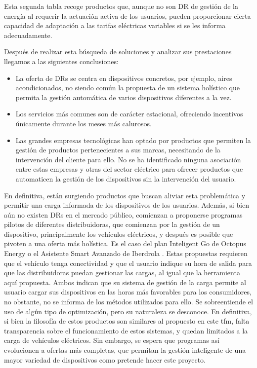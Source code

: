 \documentclass[11pt,a4paper]{book}
\begin{document}
Esta segunda tabla recoge productos que, aunque no son DR de gestión de la energía al requerir la actuación activa de los usuarios, pueden proporcionar cierta capacidad de adaptación a las tarifas eléctricas variables si se les informa adecuadamente.

Después de realizar esta búsqueda de soluciones y analizar sus prestaciones llegamos a las siguientes conclusiones:
\begin{itemize}
  \item La oferta de DRs se centra en dispositivos concretos, por ejemplo, aires acondicionados, no siendo común la propuesta de un sistema holístico que permita la gestión automática de varios dispositivos diferentes a la vez.
  \item Los servicios más comunes son de carácter estacional, ofreciendo incentivos únicamente durante los meses más calurosos. 
  \item Las grandes empresas tecnológicas han optado por productos que permiten la gestión de productos pertenecientes a sus marcas, necesitando de la intervención del cliente para ello. No se ha identificado ninguna asociación entre estas empresas y otras del sector eléctrico para ofrecer productos que automaticen la gestión de los dispositivos sin la intervención del usuario.
\end{itemize}
En definitiva, están surgiendo productos que buscan aliviar esta problemática y permitir una carga informada de los dispositivos de los usuarios. Además, si bien aún no existen DRs en el mercado público, comienzan a proponerse programas pilotos de diferentes distribuidoras, que comienzan por la gestión de un dispositivo, principalmente los vehículos eléctricos, y después es posible que pivoten a una oferta más holística. Es el caso del plan Inteligent Go de Octopus Energy \cite{octopus2024} o el Asistente Smart Avanzado de Iberdrola \cite{iberdrola2025}. Estas propuestas requieren que el vehículo tenga conectividad y que el usuario indique su hora de salida para que las distribuidoras puedan gestionar las cargas, al igual que la herramienta aquí propuesta. Ambos indican que su sistema de gestión de la carga permite al usuario cargar sus dispositivos en las horas más favorables para los consumidores, no obstante, no se informa de los métodos utilizados para ello. Se sobreentiende el uso de algún tipo de optimización, pero su naturaleza se desconoce. En definitiva, si bien la filosofía de estos productos son similares al propuesto en este \gls{tfm}, falta transparencia sobre el funcionamiento de estos sistemas, y quedan limitados a la carga de vehículos eléctricos. Sin embargo, se espera que programas así evolucionen a ofertas más completas, que permitan la gestión inteligente de una mayor variedad de dispositivos como pretende hacer este proyecto. 
\end{document}
